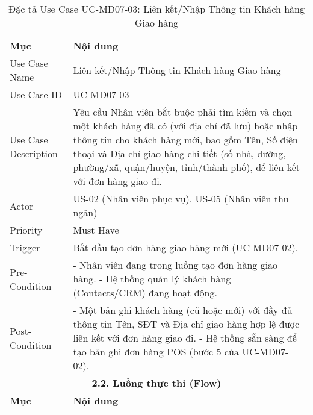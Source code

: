 \begin{longtable}{|m{4cm}|p{11cm}|}
\caption{Đặc tả Use Case UC-MD07-03: Liên kết/Nhập Thông tin Khách hàng Giao hàng} \label{tab:uc_md07_03} \\
\hline

\endhead %
\hline
\endfoot %
\hline
\endlastfoot %
\multicolumn{2}{|c|}{\textbf{2.1. Tóm tắt (Summary)}} \\
\hline
\textbf{Mục} & \textbf{Nội dung} \\
\hline
Use Case Name & Liên kết/Nhập Thông tin Khách hàng Giao hàng \\
\hline
Use Case ID & UC-MD07-03 \\
\hline
Use Case Description & Yêu cầu Nhân viên bắt buộc phải tìm kiếm và chọn một khách hàng đã có (với địa chỉ đã lưu) hoặc nhập thông tin cho khách hàng mới, bao gồm Tên, Số điện thoại và Địa chỉ giao hàng chi tiết (số nhà, đường, phường/xã, quận/huyện, tỉnh/thành phố), để liên kết với đơn hàng giao đi. \\
\hline
Actor & US-02 (Nhân viên phục vụ), US-05 (Nhân viên thu ngân) \\
\hline
Priority & Must Have \\
\hline
Trigger & Bắt đầu tạo đơn hàng giao hàng mới (UC-MD07-02). \\
\hline
Pre-Condition & - Nhân viên đang trong luồng tạo đơn hàng giao hàng. \newline - Hệ thống quản lý khách hàng (Contacts/CRM) đang hoạt động. \\
\hline
Post-Condition & - Một bản ghi khách hàng (cũ hoặc mới) với đầy đủ thông tin Tên, SĐT và Địa chỉ giao hàng hợp lệ được liên kết với đơn hàng giao đi. \newline - Hệ thống sẵn sàng để tạo bản ghi đơn hàng POS (bước 5 của UC-MD07-02). \\
\hline
\multicolumn{2}{|c|}{\textbf{2.2. Luồng thực thi (Flow)}} \\
\hline
\textbf{Mục} & \textbf{Nội dung} \\
\hline

\end{longtable}
